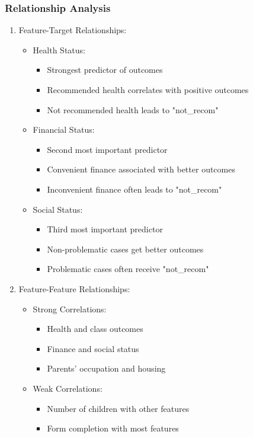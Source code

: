 \subsubsection{Relationship Analysis}
\begin{enumerate}
    \item Feature-Target Relationships:
    \begin{itemize}
        \item Health Status:
            \begin{itemize}
                \item Strongest predictor of outcomes
                \item Recommended health correlates with positive outcomes
                \item Not recommended health leads to "not\_recom"
            \end{itemize}
        \item Financial Status:
            \begin{itemize}
                \item Second most important predictor
                \item Convenient finance associated with better outcomes
                \item Inconvenient finance often leads to "not\_recom"
            \end{itemize}
        \item Social Status:
            \begin{itemize}
                \item Third most important predictor
                \item Non-problematic cases get better outcomes
                \item Problematic cases often receive "not\_recom"
            \end{itemize}
    \end{itemize}
    
    \item Feature-Feature Relationships:
    \begin{itemize}
        \item Strong Correlations:
            \begin{itemize}
                \item Health and class outcomes
                \item Finance and social status
                \item Parents' occupation and housing
            \end{itemize}
        \item Weak Correlations:
            \begin{itemize}
                \item Number of children with other features
                \item Form completion with most features
            \end{itemize}
    \end{itemize}
\end{enumerate}

